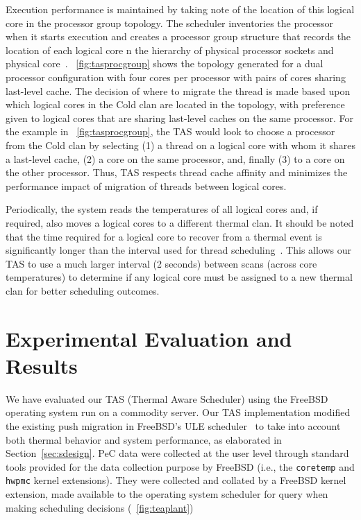 \documentclass[times, 10pt,twocolumn]{IEEEtran}
\begin{document}
Execution performance is maintained by taking note of the location of
this logical core in the processor group topology.  The scheduler
inventories the processor when it starts execution and creates a
processor group structure that records the location of each logical core
n the hierarchy of physical processor sockets and physical
core~\cite{McKusick2004b}. \figurename~\ref{fig:tasprocgroup} shows the
topology generated for a dual processor configuration with four cores
per processor with pairs of cores sharing last-level cache.  The
decision of where to migrate the thread is made based upon which logical
cores in the Cold clan are located in the topology, with preference
given to logical cores that are sharing last-level caches on the same
processor.  For the example in \figurename~\ref{fig:tasprocgroup}, the
TAS would look to choose a processor from the Cold clan by selecting (1)
a thread on a logical core with whom it shares a last-level cache, (2) a
core on the same processor, and, finally (3) to a core on the other
processor.  Thus, TAS respects thread cache affinity and minimizes the
performance impact of migration of threads between logical cores.

Periodically, the system reads the temperatures of all logical cores
and, if required, also moves a logical cores to a different thermal
clan.  It should be noted that the time required for a logical core to
recover from a thermal event is significantly longer than the interval
used for thread scheduling~\cite{Choi2007}. This allows our TAS to use a
much larger interval (2 seconds) between scans (across core
temperatures) to determine if any logical core must be assigned to a new
thermal clan for better scheduling outcomes.

\section{Experimental Evaluation and Results}
\label{sec:experiment} 
We have evaluated our TAS (Thermal Aware Scheduler) using the FreeBSD
operating system run on a commodity server.  Our TAS implementation
modified the existing push migration in FreeBSD's ULE
scheduler~\cite{Roberson2003} to take into account both thermal behavior
and system performance, as elaborated in Section~\ref{sec:sdesign}.  PeC
data were collected at the user level through standard tools provided
for the data collection purpose by FreeBSD (i.e., the \texttt{coretemp}
and \texttt{hwpmc} kernel extensions).  They were collected and collated
by a FreeBSD kernel extension, made available to the operating system
scheduler for query when making scheduling decisions
(\figurename~\ref{fig:teaplant})
\end{document}
